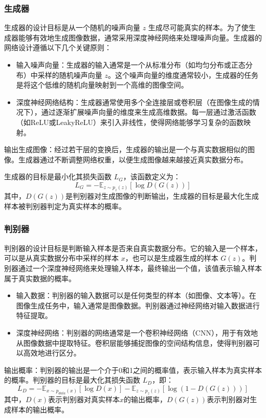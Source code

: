 \documentclass[UTF8]{ctexart}
\begin{document}
\subsubsection{生成器}
生成器的设计目标是从一个随机的噪声向量 $z$ 生成尽可能真实的样本。为了使生成器能够有效地生成图像数据，通常采用深度神经网络来处理噪声向量。生成器的网络设计遵循以下几个关键原则：
\begin{itemize}
\item 输入噪声向量：生成器的输入通常是一个从标准分布（如均匀分布或正态分布）中采样的随机噪声向量 $z$。这个噪声向量的维度通常较小，生成器的任务是将这个低维的随机向量映射到一个高维的图像空间。
\item 深度神经网络结构：生成器通常使用多个全连接层或卷积层（在图像生成的情况下），通过逐渐扩展噪声向量的维度来生成高维数据。每一层通过激活函数（如ReLU或LeakyReLU）来引入非线性，使得网络能够学习复杂的函数映射。
\end{itemize} 
输出生成图像：经过若干层的变换后，生成器的输出是一个与真实数据相似的图像。生成器通过不断调整网络权重，以便生成图像越来越接近真实数据分布。

生成器的目标是最小化其损失函数 $L_G$，该函数定义为：
$$L_G = -\mathbb{E}_{z \sim p_z(z)}[\log D(G(z))]$$
其中，$D(G(z))$是判别器对生成图像的判断输出，生成器的目标是最大化生成样本被判别器判定为真实样本的概率。
\subsubsection{判别器}
判别器的设计目标是判断输入样本是否来自真实数据分布。它的输入是一个样本，可以是从真实数据分布中采样的样本 $x$，也可以是生成器生成的样本 $G(z)$。判别器通过一个深度神经网络来处理输入样本，最终输出一个值，该值表示输入样本属于真实数据的概率。
\begin{itemize}
\item 输入数据：判别器的输入数据可以是任何类型的样本（如图像、文本等）。在图像生成任务中，输入通常是图像数据。判别器通过神经网络对输入数据进行特征提取。
\item 深度神经网络：判别器的网络通常是一个卷积神经网络（CNN），用于有效地从图像数据中提取特征。卷积层能够捕捉图像的空间结构信息，使得判别器可以高效地进行区分。
\end{itemize}

输出概率：判别器的输出是一个介于0和1之间的概率值，表示输入样本为真实样本的概率。判别器的目标是最大化其损失函数 $L_D$，即：
$$L_D = -\mathbb{E}_{x \sim p_{data}(x)}[\log D(x)] - \mathbb{E}_{z \sim p_z(z)}[\log (1 - D(G(z)))]$$
其中，$D(x)$表示判别器对真实样本$x$的输出概率，$D(G(z))$表示判别器对生成样本的输出概率。
\end{document}
